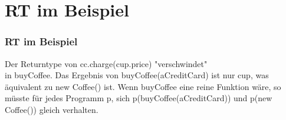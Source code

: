 \section[Section]{RT im Beispiel}
	\begin{frame}[fragile]
	\frametitle{RT im Beispiel}
	\begin{tcolorbox}[colback=blue!5,colframe=brightcerulean,title=RT im Beispiel]
		Der Returntype von cc.charge(cup.price) "verschwindet"\\
		in buyCoffee. Das Ergebnis von buyCoffee(aCreditCard) ist
		nur cup, was äquivalent zu new Coffee() ist. Wenn buyCoffee eine reine 				Funktion wäre, so müsste für jedes Programm p, sich 								p(buyCoffee(aCreditCard)) und p(new Coffee()) gleich verhalten.
	\end{tcolorbox}
\end{frame}

			
